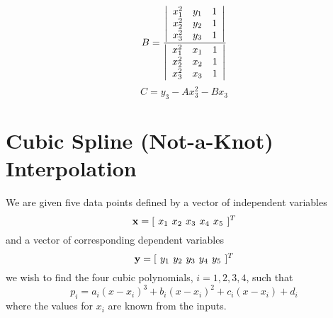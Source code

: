 %
\begin{equation}
    B = \frac{
    \left|%
    \begin{array}{ccc}
     x_1^2 & y_1 & 1 \\
     x_2^2 & y_2 & 1 \\
     x_3^2 & y_3 & 1 \\
    \end{array}%
    \right|
    }
    {    \left|%
    \begin{array}{ccc}
       x_1^2 & x_1 & 1 \\
       x_2^2 & x_2 & 1 \\
       x_3^2 & x_3 & 1 \\
    \end{array}%
    \right|}
\end{equation}
%
\begin{equation}
    C = y_3 - A x_3^2 - B x_3
\end{equation}

\section{Cubic Spline (Not-a-Knot) Interpolation }

We are given five data points defined by a vector of independent
variables
%
\begin{equation}
     \mathbf{x} = [\hspace{.05 in} x_1 \hspace{.05 in} x_2 \hspace{.05 in}
     x_3 \hspace{.05 in} x_4 \hspace{.05 in} x_5 \hspace{.05
     in}]^T
\end{equation}
%
and a vector of corresponding dependent variables
%
\begin{equation}
     \mathbf{y} = [\hspace{.05 in} y_1 \hspace{.05 in} y_2 \hspace{.05 in}
     y_3 \hspace{.05 in} y_4 \hspace{.05 in} y_5 \hspace{.05
     in}]^T
\end{equation}
%
we wish to find the four cubic polynomials, $i = 1,2,3,4$, such that
%
\begin{equation}
    p_i = a_i(x - x_i)^3 + b_i(x - x_i)^2 + c_i(x - x_i) + d_i
\end{equation}
%
where the values for $x_i$ are known from the inputs.

